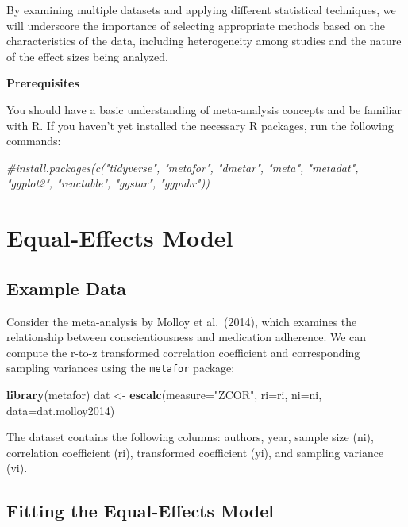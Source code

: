 \documentclass[
]{book}
\newenvironment{Shaded}{\begin{snugshade}}{\end{snugshade}}
\newcommand{\AttributeTok}[1]{\textcolor[rgb]{0.13,0.29,0.53}{#1}}
\newcommand{\CommentTok}[1]{\textcolor[rgb]{0.56,0.35,0.01}{\textit{#1}}}
\newcommand{\FunctionTok}[1]{\textcolor[rgb]{0.13,0.29,0.53}{\textbf{#1}}}
\newcommand{\NormalTok}[1]{#1}
\newcommand{\OtherTok}[1]{\textcolor[rgb]{0.56,0.35,0.01}{#1}}
\newcommand{\StringTok}[1]{\textcolor[rgb]{0.31,0.60,0.02}{#1}}
\begin{document}
By examining multiple datasets and applying different statistical techniques, we will underscore the importance of selecting appropriate methods based on the characteristics of the data, including heterogeneity among studies and the nature of the effect sizes being analyzed.

\textbf{Prerequisites}

You should have a basic understanding of meta-analysis concepts and be familiar with R. If you haven't yet installed the necessary R packages, run the following commands:

\begin{Shaded}
\begin{Highlighting}[]
\CommentTok{\#install.packages(c("tidyverse", "metafor", "dmetar", "meta", "metadat", "ggplot2", "reactable", "ggstar", "ggpubr"))}
\end{Highlighting}
\end{Shaded}

\section{Equal-Effects Model}\label{equal-effects-model}

\subsection{Example Data}\label{example-data}

Consider the meta-analysis by Molloy et al.~(2014), which examines the relationship between conscientiousness and medication adherence. We can compute the r-to-z transformed correlation coefficient and corresponding sampling variances using the \texttt{metafor} package:

\begin{Shaded}
\begin{Highlighting}[]
\FunctionTok{library}\NormalTok{(metafor)}
\NormalTok{dat }\OtherTok{\textless{}{-}} \FunctionTok{escalc}\NormalTok{(}\AttributeTok{measure=}\StringTok{"ZCOR"}\NormalTok{, }\AttributeTok{ri=}\NormalTok{ri, }\AttributeTok{ni=}\NormalTok{ni, }\AttributeTok{data=}\NormalTok{dat.molloy2014)}
\end{Highlighting}
\end{Shaded}

The dataset contains the following columns: authors, year, sample size (ni), correlation coefficient (ri), transformed coefficient (yi), and sampling variance (vi).

\subsection{Fitting the Equal-Effects Model}\label{fitting-the-equal-effects-model}
\end{document}

